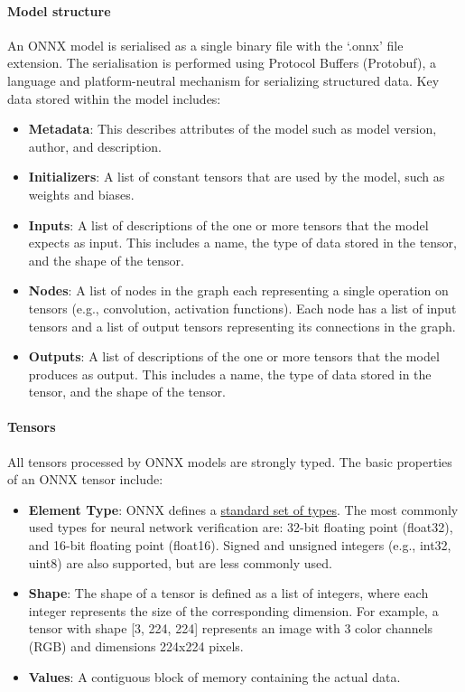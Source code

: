 \paragraph{Model structure} 

An ONNX model is serialised as a single binary file with the `.onnx' file extension. The serialisation is performed using Protocol Buffers (Protobuf), a language and platform-neutral mechanism for serializing structured data. Key data stored within the model includes:
\begin{itemize}
	\item \textbf{Metadata}: This describes attributes of the model such as model version, author, and description.
	\item \textbf{Initializers}: A list of constant tensors that are used by the model, such as weights and biases.
	\item \textbf{Inputs}: A list of descriptions of the one or more tensors that the model expects as input. This includes a name, the type of data stored in the tensor, and the shape of the tensor.
	\item \textbf{Nodes}: A list of nodes in the graph each representing a single operation on  tensors (e.g., convolution, activation functions). Each node has a list of input tensors and a list of output tensors representing its connections in the graph.
	\item \textbf{Outputs}: A list of descriptions of the one or more tensors that the model produces as output. This includes a name, the type of data stored in the tensor, and the shape of the tensor.
\end{itemize}


\paragraph{Tensors}
All tensors processed by ONNX models are strongly typed. The basic properties of an ONNX tensor include:
\begin{itemize}
	\item \textbf{Element Type}: ONNX defines a \href{https://onnx.ai/onnx/repo-docs/IR.html#tensor-element-types}{standard set of types}. 
	The most commonly used types for neural network verification are: 32-bit floating point (float32), and 16-bit floating point (float16). Signed and unsigned integers (e.g., int32, uint8) are also supported, but are less commonly used.
	\item \textbf{Shape}: The shape of a tensor is defined as a list of integers, where each integer represents the size of the corresponding dimension. For example, a tensor with shape [3, 224, 224] 
	represents an image with 3 color channels (RGB) and dimensions 224x224 pixels.
	\item \textbf{Values}: A contiguous block of memory containing the actual data.
\end{itemize}


